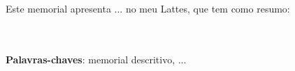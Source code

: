
\setlength{\absparsep}{18pt} %
\begin{resumo}
  Este memorial apresenta ... no meu Lattes, que tem como resumo:\vspace{-5mm}
  
 \\ \\
 \textbf{Palavras-chaves}: memorial descritivo, ...
\end{resumo}




 
